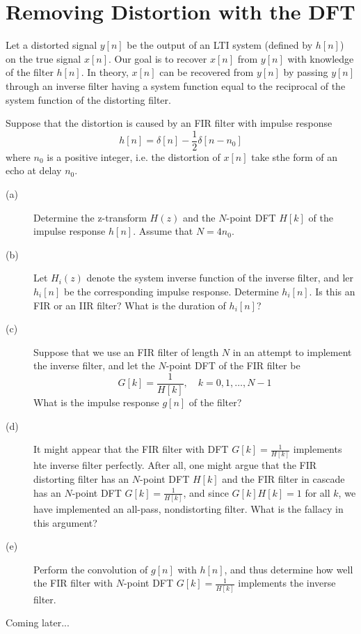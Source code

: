 \documentclass[11pt]{article}
\begin{document}
\section{Removing Distortion with the DFT}

Let a distorted signal $y[n]$ be the output of an LTI system (defined by $h[n]$) on the true signal $x[n]$. Our goal is to recover $x[n]$ from $y[n]$ with knowledge of the filter $h[n]$. In theory, $x[n]$ can be recovered from $y[n]$ by passing $y[n]$ through an inverse filter having a system function equal to the reciprocal of the system function of the distorting filter.

Suppose that the distortion is caused by an FIR filter with impulse response 
\[ h[n] = \delta[n] -\frac{1}{2}\delta[n-n_0] \]
where $n_0$ is a positive integer, i.e. the distortion of $x[n]$ take sthe form of an echo at delay $n_0$.

\begin{description}
\item[(a)] Determine the z-transform $H(z)$ and the $N$-point DFT $H[k]$ of the impulse response $h[n]$. Assume that $N = 4n_0$.
\item[(b)] Let $H_i(z)$ denote the system inverse function of the inverse filter, and ler $h_i[n]$ be the corresponding impulse response. Determine $h_i[n]$. Is this an FIR or an IIR filter? What is the duration of $h_i[n]$?
\item[(c)] Suppose that we use an FIR filter of length $N$ in an attempt to implement the inverse filter, and let the $N$-point DFT of the FIR filter be
\[ G[k]=\frac{1}{H[k]}, \quad k=0,1,\ldots,N-1 \]
What is the impulse response $g[n]$ of the filter?
\item[(d)] It might appear that the FIR filter with DFT $G[k]=\frac{1}{H[k]}$ implements hte inverse filter perfectly. After all, one might argue that the FIR distorting filter has an $N$-point DFT $H[k]$ and the FIR filter in cascade has an $N$-point DFT $G[k]=\frac{1}{H[k]}$, and since $G[k]H[k]=1$ for all $k$, we have implemented an all-pass, nondistorting filter. What is the fallacy in this argument?
\item[(e)] Perform the convolution of $g[n]$ with $h[n]$, and thus determine how well the FIR filter with $N$-point DFT $G[k]=\frac{1}{H[k]}$ implements the inverse filter.
\end{description}

{\color{blue}




Coming later...
}
\end{document}
